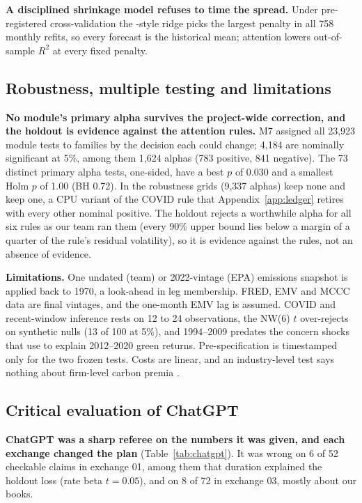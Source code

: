 \textbf{A disciplined shrinkage model refuses to time the spread.} Under pre-registered cross-validation the \citet{lmn2024}-style ridge picks the largest penalty in all 758 monthly refits, so every forecast is the historical mean; attention lowers out-of-sample $R^2$ at every fixed penalty.

\subsection{Robustness, multiple testing and limitations}
\label{sec:robust}

\textbf{No module's primary alpha survives the project-wide correction, and the holdout is evidence against the attention rules.} M7 assigned all 23,923 module tests to families by the decision each could change; 4,184 are nominally significant at 5\%, among them 1,624 alphas (783 positive, 841 negative). The 73 distinct primary alpha tests, one-sided, have a best $p$ of 0.030 and a smallest Holm $p$ of 1.00 (BH 0.72). In the robustness grids (9,337 alphas) \citet{by2001} keep none and \citet{bh1995} keep one, a CPU variant of the COVID rule that Appendix~\ref{app:ledger} retires with every other nominal positive. The holdout rejects a worthwhile alpha for all six rules as our team ran them (every 90\% upper bound lies below a margin of a quarter of the rule's residual volatility), so it is evidence against the rules, not an absence of evidence.

\textbf{Limitations.} One undated (team) or 2022-vintage (EPA) emissions snapshot is applied back to 1970, a look-ahead in leg membership. FRED, EMV and MCCC data are final vintages, and the one-month EMV lag is assumed. COVID and recent-window inference rests on 12 to 24 observations, the NW(6) $t$ over-rejects on synthetic nulls (13 of 100 at 5\%), and 1994--2009 predates the concern shocks that \citet{pst2022} use to explain 2012--2020 green returns. Pre-specification is timestamped only for the two frozen tests. Costs are linear, and an industry-level test says nothing about firm-level carbon premia \citep{bk2021}.

\subsection{Critical evaluation of ChatGPT}
\label{sec:gpt}

\textbf{ChatGPT was a sharp referee on the numbers it was given, and each exchange changed the plan} (Table~\ref{tab:chatgpt}). It was wrong on 6 of 52 checkable claims in exchange 01, among them that duration explained the holdout loss (rate beta $t=0.05$), and on 8 of 72 in exchange 03, mostly about our books.

